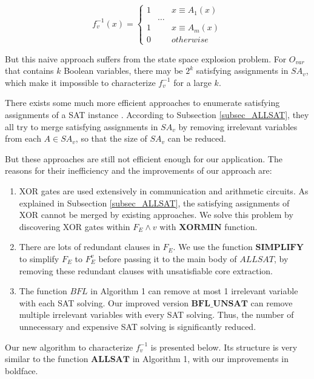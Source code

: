 \documentclass[journal]{IEEEtran}
\begin{document}
\begin{equation}\label{fneg1v}
f^{-1}_v(x) = \left\{ \begin{array}{lll}
1 & & x\equiv A_1(x) \\
  & \dots &  \\
1 & & x\equiv A_m(x) \\
0 & & otherwise
\end{array}
\right.
\end{equation}

But this naive approach suffers from the state space explosion problem.
For $O_{var}$ that contains $k$ Boolean variables,
there may be $2^k$ satisfying assignments in $SA_v$,
which make it impossible to characterize $f^{-1}_v$ for a large $k$.

There exists some much more efficient approaches
to enumerate satisfying assignments of a SAT instance
\cite{PRIMECLAUSE,SATUNBMC,MINASS,EFFCON,MINCEX,MEMEFFALLSAT,REPARAM,EFFSATUSMCCO}.
According to Subsection \ref{subsec_ALLSAT},
they all try to merge satisfying assignments in $SA_v$ by removing irrelevant variables from each $A\in SA_v$,
so that the size of $SA_v$ can be reduced.

But these approaches are still not efficient enough for our application.
The reasons for their inefficiency and the improvements of our approach are:
\begin{enumerate}
\item XOR gates are used extensively in communication and arithmetic circuits.
As explained in Subsection \ref{subsec_ALLSAT},
the satisfying assignments of XOR cannot be merged by existing approaches.
We solve this problem by discovering XOR gates within $F_E\wedge v$ with $\boldsymbol{XORMIN}$ function.
\item There are lots of redundant clauses in $F_E$.
We use the function $\boldsymbol{SIMPLIFY}$ to simplify $F_E$ to $F_E^v$ before passing it to the main body of $ALLSAT$,
by removing these redundant clauses with unsatisfiable core extraction.
\item The function $BFL$ in Algorithm 1 can remove at most 1 irrelevant variable with each SAT solving. Our improved version $\boldsymbol{BFL\_UNSAT}$ can remove multiple irrelevant variables with every SAT solving. Thus, the number of unnecessary and expensive SAT solving is significantly reduced.
\end{enumerate}

Our new algorithm to characterize $f^{-1}_v$ is presented below.
Its structure is very similar to the function $\boldsymbol{ALLSAT}$ in Algorithm 1,
with our improvements in boldface.
\end{document}
